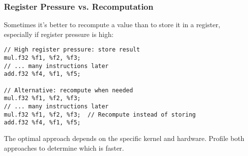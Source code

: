 \subsubsection{Register Pressure vs. Recomputation}

Sometimes it's better to recompute a value than to store it in a register, especially if register pressure is high:

\begin{lstlisting}[style=ptx]
// High register pressure: store result
mul.f32 %f1, %f2, %f3;
// ... many instructions later
add.f32 %f4, %f1, %f5;

// Alternative: recompute when needed
mul.f32 %f1, %f2, %f3;
// ... many instructions later
mul.f32 %f1, %f2, %f3;  // Recompute instead of storing
add.f32 %f4, %f1, %f5;
\end{lstlisting}

The optimal approach depends on the specific kernel and hardware. Profile both approaches to determine which is faster.

